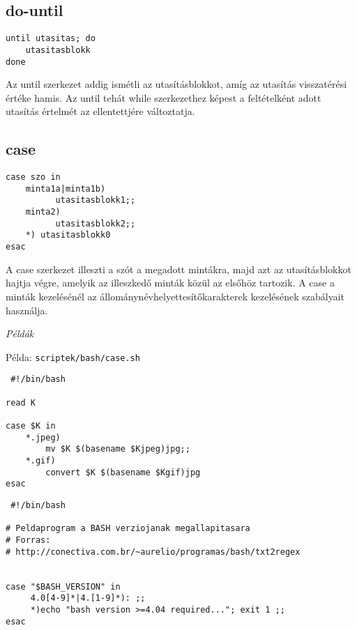 \subsection{do-until}
\begin{lstlisting}
until utasitas; do	
    utasitasblokk
done
\end{lstlisting}

Az until szerkezet addig ismétli az utasításblokkot, amíg az utasítás visszatérési értéke hamis. 
Az until tehát while szerkezethez képest a feltételként adott utasítás értelmét az ellentettjére változtatja.

\vfill\pagebreak
\subsection{case}
 \begin{lstlisting}
case szo in
    minta1a|minta1b)
          utasitasblokk1;;
    minta2)
          utasitasblokk2;;
    *) utasitasblokk0
esac
 \end{lstlisting}

A case szerkezet illeszti a szót a megadott mintákra, majd azt az utasításblokkot hajtja végre,
amelyik az illeszkedő minták közül az elsőhöz tartozik. A case a minták kezelésénél az
állománynévhelyettesítőkarakterek kezelésének szabályait használja.
\bigskip

\emph{Példák}

\begin{minipage}{0.425\textwidth}
Példa: \texttt{scriptek/bash/case.sh}
\lstset{linewidth=\textwidth}
\begin{lstlisting}
 #!/bin/bash

read K

case $K in
    *.jpeg)
        mv $K $(basename $Kjpeg)jpg;;
    *.gif)
        convert $K $(basename $Kgif)jpg
esac
\end{lstlisting}
\end{minipage}
\hspace{1em}
\begin{minipage}{0.425\textwidth}
\lstset{linewidth=\textwidth}
\begin{lstlisting}
 #!/bin/bash

# Peldaprogram a BASH verziojanak megallapitasara
# Forras: 
# http://conectiva.com.br/~aurelio/programas/bash/txt2regex


case "$BASH_VERSION" in
     4.0[4-9]*|4.[1-9]*): ;;
     *)echo "bash version >=4.04 required..."; exit 1 ;;
esac
\end{lstlisting}
\end{minipage}


